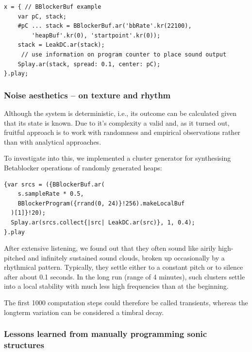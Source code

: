 \documentclass[letterpaper, 12pt]{article}
\begin{document}
\begin{Verbatim}[fontfamily=courier, xleftmargin=\parindent]
x = { // BBlockerBuf example
	var pC, stack;
	#pC ... stack = BBlockerBuf.ar('bbRate'.kr(22100), 
		'heapBuf'.kr(0), 'startpoint'.kr(0));
	stack = LeakDC.ar(stack);
	 // use information on program counter to place sound output
	Splay.ar(stack, spread: 0.1, center: pC);
}.play;
\end{Verbatim}

\parskip 18pt

\subsubsection{Noise aesthetics -- on texture and rhythm} 
\label{sub:noise_aesthetics}

Although the system is deterministic, i.e., its outcome can be calculated given that its state is known.
Due to it's complexity a valid and, as it turned out, fruitful approach is to work with randomness and empirical observations rather than with analytical approaches.

To investigate into this, we implemented a cluster generator for synthesising Betablocker operations of randomly generated heaps:
\begin{Verbatim}[fontfamily=courier, xleftmargin=\parindent]
{var srcs = ({BBlockerBuf.ar(
    s.sampleRate * 0.5, 
    BBlockerProgram({rrand(0, 24)}!256).makeLocalBuf
  )[1]}!20);
  Splay.ar(srcs.collect{|src| LeakDC.ar(src)}, 1, 0.4);
}.play
\end{Verbatim}
After extensive listening, we found out that they often sound like airily high-pitched and infinitely sustained sound clouds, broken up occasionally by a rhythmical pattern. 
Typically, they settle either to a constant pitch or to silence after about 0.1 seconds.
In the long run (range of 4 minutes), such clusters settle into a local stability with much less high frequencies than at the beginning. 

The first 1000 computation steps could therefore be called transients, whereas the longterm variation can be considered a timbral decay.

\parskip 18pt

\subsubsection{Lessons learned from manually programming sonic structures}
\label{sub:manual_programming_sonic_structures}
\end{document}
